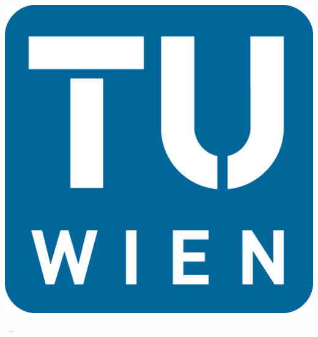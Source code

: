 
%               

\begin{titlepage}
	\begin{center}
		\includegraphics[scale=0.9]{titlepage/media/tu-signet.png}
		\vspace*{\fill}
		
		{\LARGE \bfseries \prtypeENG}
		\vspace*{1cm}
		
		{\Huge \bfseries \prsubjectENG}
		\vspace*{0.5cm}
		
		{\Large \prdescriptionENG}
		\vspace*{1cm}
		
		{\large \lvafilltextENG}
		\vspace*{\fill}
		
		{\Large \lva~--~\lvanr}
		\vspace*{\fill}
		

\end{center}
\end{titlepage}
